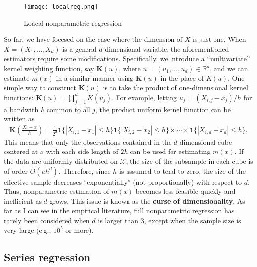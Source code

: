 \documentclass[11pt, A4paper, openany, uplatex]{book}
\begin{document}
\begin{figure}[h!]
	\begin{center}
		\texttt{[image: localreg.png]}
		\caption{Loacal nonparametric regression}
	\end{center}
\end{figure}

So far, we have focesed on the case where the dimension of $X$ is just one.
When $X = (X_1, \ldots, X_d)$ is a general $d$-dimensional variable, the aforementioned estimators require some modifications.
Specifically, we introduce a ``multivariate'' kernel weighting function, say $\mathbf{K}(u)$, where $u = (u_1, \ldots, u_d) \in \mathbb{R}^d$, and we can estimate $m(x)$ in a similar manner using $\mathbf{K}(u)$ in the place of $K(u)$.
One simple way to construct $\mathbf{K}(u)$ is to take the product of one-dimensional kernel functions: $\mathbf{K}(u) = \prod_{j=1}^d K(u_j)$.
For example, letting $u_j = (X_{i,j} -x_j)/h$ for a bandwith $h$ common to all $j$, the product uniform kernel function can be written as
\begin{align*}
	\mathbf{K}\left(\frac{X_i - x}{h}\right) = \frac{1}{2^d}\mathbf{1}\{|X_{i,1} - x_1| \le h\}\mathbf{1}\{|X_{i,2} - x_2| \le h\} \times \cdots \times \mathbf{1}\{|X_{i,d} - x_d| \le h\}.
\end{align*}
This means that only the observations contained in the $d$-dimensional cube centered at $x$ with each side length of $2h$ can be used for estimating $m(x)$.
If the data are uniformly distributed on $\mathcal{X}$, the size of the subsample in each cube is of order $O(nh^d)$.
Therefore, since $h$ is assumed to tend to zero, the size of the effective sample decreases ``exponentially'' (not proportionally) with respect to $d$.
Thus, nonparametric estimation of $m(x)$ becomes less feasible quickly and inefficient as $d$ grows.
This issue is known as the \textbf{curse of dimensionality}.
As far as I can see in the empirical literature, full nonparametric regression has rarely been considered when $d$ is larger than 3, except when the sample size is very large (e.g., $10^5$ or more).

\subsection{Series regression}
\end{document}
